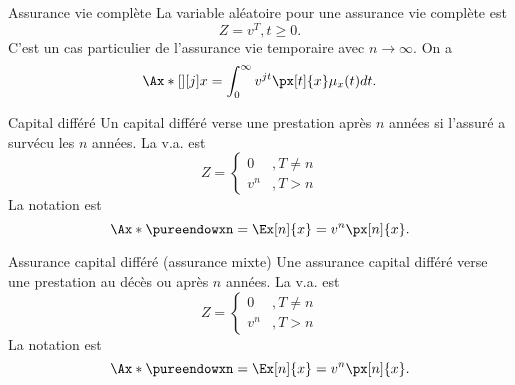 \begin{definition}{Assurance vie complète}{}
	La variable aléatoire pour une assurance vie complète est $$Z=v^T, t\geq 0.$$ C'est un cas particulier de l'assurance vie temporaire avec $n\to \infty$. On a 
	$$\Ax*[][j]{x} =  \int_{0}^{\infty}v^{jt} \px[t]{x}\mu_x(t) dt.$$
\end{definition}

\begin{definition}{Capital différé}{}
	Un capital différé verse une prestation après $n$ années si l'assuré a survécu les $n$ années. La v.a. est
	$$Z = \begin{cases}
	0&, T\neq n\\
	v^n&, T > n
	\end{cases}$$	
	La notation est 
	$$\Ax*{\pureendowxn} = \Ex[n]{x}= v^n \px[n]{x}.$$
\end{definition}

\begin{definition}{Assurance capital différé (assurance mixte)}{}
	Une assurance capital différé verse une prestation au décès ou après $n$ années. La v.a. est
	$$Z = \begin{cases}
	0&, T\neq n\\
	v^n&, T > n
	\end{cases}$$	
	La notation est 
	$$\Ax*{\pureendowxn} = \Ex[n]{x}= v^n \px[n]{x}.$$
\end{definition}




